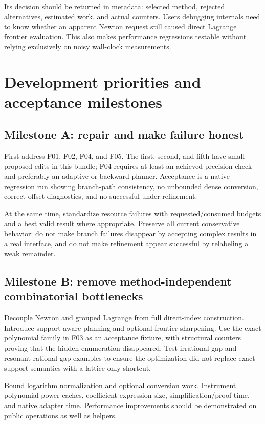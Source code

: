 \documentclass[11pt,a4paper]{article}
\theoremstyle{definition}
\begin{document}
Its decision should be returned in metadata: selected method, rejected alternatives, estimated work, and actual counters. Users debugging internals need to know whether an apparent Newton request still caused direct Lagrange frontier evaluation. This also makes performance regressions testable without relying exclusively on noisy wall-clock measurements.

\section{Development priorities and acceptance milestones}
\label{sec:roadmap}

\subsection{Milestone A: repair and make failure honest}

First address F01, F02, F04, and F05. The first, second, and fifth have small proposed edits in this bundle; F04 requires at least an achieved-precision check and preferably an adaptive or backward planner. Acceptance is a native regression run showing branch-path consistency, no unbounded dense conversion, correct offset diagnostics, and no successful under-refinement.

At the same time, standardize resource failures with requested/consumed budgets and a best valid result where appropriate. Preserve all current conservative behavior: do not make branch failures disappear by accepting complex results in a real interface, and do not make refinement appear successful by relabeling a weak remainder.

\subsection{Milestone B: remove method-independent combinatorial bottlenecks}

Decouple Newton and grouped Lagrange from full direct-index construction. Introduce support-aware planning and optional frontier sharpening. Use the exact polynomial family in F03 as an acceptance fixture, with structural counters proving that the hidden enumeration disappeared. Test irrational-gap and resonant rational-gap examples to ensure the optimization did not replace exact support semantics with a lattice-only shortcut.

Bound logarithm normalization and optional conversion work. Instrument polynomial power caches, coefficient expression size, simplification/proof time, and native adapter time. Performance improvements should be demonstrated on public operations as well as helpers.
\end{document}
